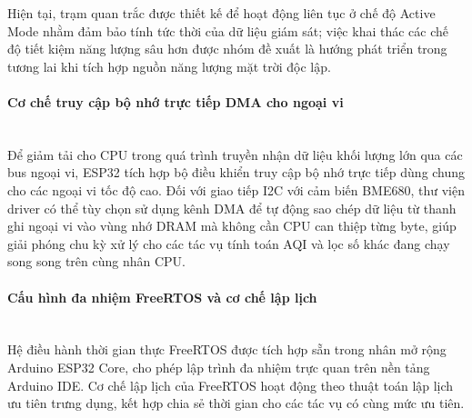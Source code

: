 \documentclass[12pt,a4paper]{article}
\begin{document}
Hiện tại, trạm quan trắc được thiết kế để hoạt động liên tục ở chế độ Active Mode nhằm đảm bảo tính tức thời của dữ liệu giám sát; việc khai thác các chế độ tiết kiệm năng lượng sâu hơn được nhóm đề xuất là hướng phát triển trong tương lai khi tích hợp nguồn năng lượng mặt trời độc lập.

\paragraph{Cơ chế truy cập bộ nhớ trực tiếp DMA cho ngoại vi}\mbox{}\\

Để giảm tải cho CPU trong quá trình truyền nhận dữ liệu khối lượng lớn qua các bus ngoại vi, ESP32 tích hợp bộ điều khiển truy cập bộ nhớ trực tiếp dùng chung cho các ngoại vi tốc độ cao. Đối với giao tiếp I2C với cảm biến BME680, thư viện driver có thể tùy chọn sử dụng kênh DMA để tự động sao chép dữ liệu từ thanh ghi ngoại vi vào vùng nhớ DRAM mà không cần CPU can thiệp từng byte, giúp giải phóng chu kỳ xử lý cho các tác vụ tính toán AQI và lọc số khác đang chạy song song trên cùng nhân CPU.

\paragraph{Cấu hình đa nhiệm FreeRTOS và cơ chế lập lịch}\mbox{}\\

Hệ điều hành thời gian thực FreeRTOS được tích hợp sẵn trong nhân mở rộng Arduino ESP32 Core, cho phép lập trình đa nhiệm trực quan trên nền tảng Arduino IDE. Cơ chế lập lịch của FreeRTOS hoạt động theo thuật toán lập lịch ưu tiên trưng dụng, kết hợp chia sẻ thời gian cho các tác vụ có cùng mức ưu tiên.
\end{document}
